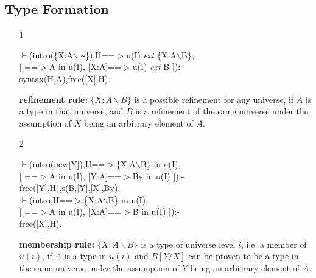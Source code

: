 \documentclass[11pt]{report}
\begin{document}
 \subsection{Type Formation}
  
 \begin{enumerate}
 \item[1]
\begin{sf}\begin{tabbing}
$\vdash$(intro(\{X:A$\backslash$ {\verb`~`}\}),H==$>$u(I) \mbox{\it ext} \{X:A$\backslash$B\}, \\[-0.15ex]
\hspace{2em}[ ==$>$A in u(I), [X:A]==$>$u(I) \mbox{\it ext} B ]):-\\[-0.15ex]
\hspace{2em}syntax(H,A),free([X],H).
\end{tabbing}\end{sf}

 {\bf refinement rule:} 
 $\{X:A\backslash B\}$ is a possible refinement
 for any universe, if $A$ is a type in that universe,
 and $B$ is a refinement of the same universe under the assumption of 
 $X$ being an arbitrary element of $A$.
  
 \item[2]
\begin{sf}\begin{tabbing}
$\vdash$(intro(new[Y]),H==$>$\{X:A$\backslash$B\} in u(I), \\[-0.15ex]
\hspace{2em}[ ==$>$A in u(I), [Y:A]==$>$By in u(I) ]):-\\[-0.15ex]
\hspace{2em}free([Y],H),s(B,[Y],[X],By).\\[-0.15ex]
$\vdash$(intro,H==$>$\{X:A$\backslash$B\} in u(I), \\[-0.15ex]
\hspace{2em}[ ==$>$A in u(I), [X:A]==$>$B in u(I) ]):-\\[-0.15ex]
\hspace{2em}free([X],H).
\end{tabbing}\end{sf}

 {\bf membership rule:} 
 $\{X:A\backslash B\}$ is a type of universe level $i$,
 i.e. a member of $u(i)$, if $A$ is a type in $u(i)$ and $B[Y/X]$ can 
 be proven to be a type in the same universe under the assumption of $Y$
 being an arbitrary element of $A$.
  

\end{enumerate}
\end{document}

